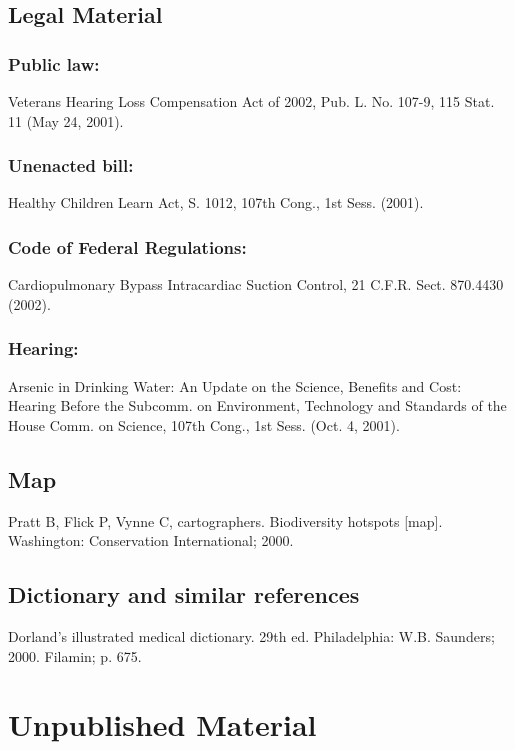 \documentclass[a4paper,10pt]{article}
\begin{document}
\subsection{Legal Material}

\subsubsection{Public law:}
Veterans Hearing Loss Compensation Act of 2002, Pub. L. No. 107-9, 115 Stat. 11 (May 24, 2001).

\subsubsection{Unenacted bill:}
Healthy Children Learn Act, S. 1012, 107th Cong., 1st Sess. (2001).

\subsubsection{Code of Federal Regulations:}
Cardiopulmonary Bypass Intracardiac Suction Control, 21 C.F.R. Sect. 870.4430 (2002).

\subsubsection{Hearing:}
Arsenic in Drinking Water: An Update on the Science, Benefits and Cost: Hearing Before the Subcomm. on Environment, Technology and Standards of the House Comm. on Science, 107th Cong., 1st Sess. (Oct. 4, 2001).

\subsection{Map}

Pratt B, Flick P, Vynne C, cartographers. Biodiversity hotspots [map]. Washington: Conservation International; 2000.\cite{prat.flick.ea:biodiversity}

\subsection{Dictionary and similar references}

Dorland's illustrated medical dictionary. 29th ed. Philadelphia: W.B. Saunders; 2000. Filamin; p. 675.\cite{filamin}

\section{Unpublished Material}
\end{document}
